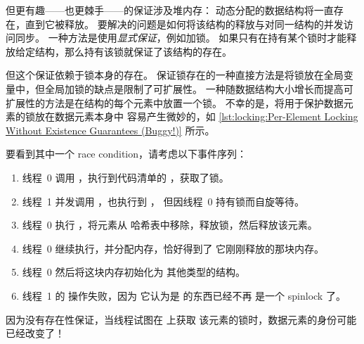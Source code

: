 但更有趣——也更棘手——的保证涉及堆内存：
动态分配的数据结构将一直存在，直到它被释放。
要解决的问题是如何将该结构的释放与对同一结构的并发访问同步。
一种方法是使用\emph{显式保证}，例如加锁。
如果只有在持有某个锁时才能释放给定结构，那么持有该锁就保证了该结构的存在。

但这个保证依赖于锁本身的存在。
保证锁存在的一种直接方法是将锁放在全局变量中，但全局加锁的缺点是限制了可扩展性。
一种随数据结构大小增长而提高可扩展性的方法是在结构的每个元素中放置一个锁。
不幸的是，将用于保护数据元素的锁放在数据元素本身中
容易产生微妙的，如
\cref{lst:locking:Per-Element Locking Without Existence Guarantees (Buggy!)}
所示。

\QuickQuizEnd


\begin{fcvref}
要看到其中一个 race condition，请考虑以下事件序列：
\begin{enumerate}
\item	线程~0 调用 ，执行到代码清单的 ，获取了锁。
\item	线程~1 并发调用 ，也执行到 ，
	但因线程~0 持有锁而自旋等待。
\item	线程~0 执行 ，将元素从
	哈希表中移除，释放锁，然后释放该元素。
\item	线程~0 继续执行，并分配内存，恰好得到了
	它刚刚释放的那块内存。
\item	线程~0 然后将这块内存初始化为
	其他类型的结构。
\item	线程~1 的  操作失败，因为
	它认为是  的东西已经不再
	是一个 spinlock 了。
\end{enumerate}
因为没有存在性保证，当线程试图在  上获取
该元素的锁时，数据元素的身份可能已经改变了！
\end{fcvref}

